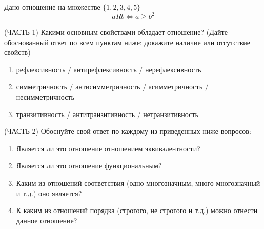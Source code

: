 \question
Дано отношение на множестве $\{1, 2, 3, 4, 5\}$ 
\begin{equation*}
	aRb \iff a \geqslant b^2
\end{equation*}

(ЧАСТЬ 1) Какими основным свойствами обладает отношение? (Дайте обоснованный ответ по всем пунктам ниже: докажите наличие или отсутствие свойств)  
\begin{enumerate}
	\renewcommand{\labelenumi}{\alph{enumi})}
	\item рефлексивность / антирефлексивность / нерефлексивность
	\item симметричность / антисимметричность / асимметричность / несимметричность
	\item транзитивность / антитранзитивность / нетранзитивность
\end{enumerate}

(ЧАСТЬ 2) Обоснуйте свой ответ по каждому из приведенных ниже вопросов:
\begin{enumerate}
	\renewcommand{\labelenumi}{\alph{enumi})}
    \item Является ли это отношение отношением эквивалентности?
    \item Является ли это отношение функциональным?
    \item Каким из отношений соответствия (одно-многозначным, много-многозначный и т.д.) оно является?
    \item К каким из отношений порядка (строгого, не строгого и т.д.) можно отнести данное отношение?
\end{enumerate}

